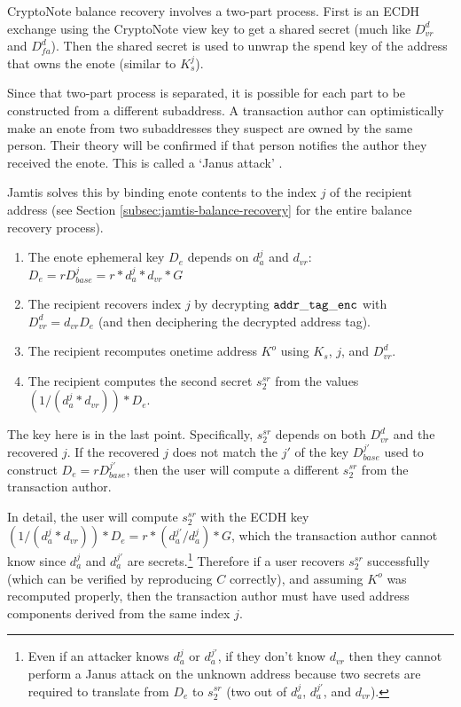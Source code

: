 CryptoNote balance recovery involves a two-part process. First is an ECDH exchange using the CryptoNote view key to get a shared secret (much like $D^d_{vr}$ and $D^d_{fa}$). Then the shared secret is used to unwrap the spend key of the address that owns the enote (similar to $K^j_s$).

Since that two-part process is separated, it is possible for each part to be constructed from a different subaddress. A transaction author can optimistically make an enote from two subaddresses they suspect are owned by the same person. Their theory will be confirmed if that person notifies the author they received the enote. This is called a `Janus attack' \cite{janus-attack}.

Jamtis solves this by binding enote contents to the index $j$ of the recipient address (see Section \ref{subsec:jamtis-balance-recovery} for the entire balance recovery process).
\begin{enumerate}
    \item The enote ephemeral key $D_e$ depends on $d^j_a$ and $d_{vr}$: $D_e = r D^j_{base} = r * d^j_a * d_{vr} * G$

    \item The recipient recovers index $j$ by decrypting ${\tt addr\_tag\_enc}$ with $D^d_{vr} = d_{vr} D_e$ (and then deciphering the decrypted address tag).

    \item The recipient recomputes onetime address $K^o$ using $K_s$, $j$, and $D^d_{vr}$.

    \item The recipient computes the second secret $s^{sr}_2$ from the values $(1/(d^j_a * d_{vr})) * D_e$.
\end{enumerate}

The key here is in the last point. Specifically, $s^{sr}_2$ depends on both $D^d_{vr}$ and the recovered $j$. If the recovered $j$ does not match the $j'$ of the key $D^{j'}_{base}$ used to construct $D_e = r D^{j'}_{base}$, then the user will compute a different $s^{sr}_2$ from the transaction author.

In detail, the user will compute $s^{sr}_2$ with the ECDH key $(1/(d^j_a * d_{vr})) * D_e = r * (d^{j'}_a/d^{j}_a) * G$, which the transaction author cannot know since $d^{j}_a$ and $d^{j'}_a$ are secrets.\footnote{Even if an attacker knows $d^{j}_a$ or $d^{j'}_a$, if they don't know $d_{vr}$ then they cannot perform a Janus attack on the unknown address because two secrets are required to translate from $D_e$ to $s^{sr}_2$ (two out of $d^{j}_a$, $d^{j'}_a$, and $d_{vr}$).} Therefore if a user recovers $s^{sr}_2$ successfully (which can be verified by reproducing $C$ correctly), and assuming $K^o$ was recomputed properly, then the transaction author must have used address components derived from the same index $j$.

